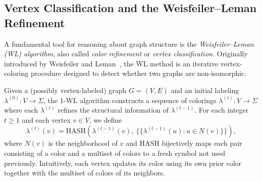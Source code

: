 




\subsection{Vertex Classification and the Weisfeiler--Leman Refinement}

A fundamental tool for reasoning about graph structure is the \emph{Weisfeiler--Leman (WL) algorithm}, also called \emph{color refinement} or \emph{vertex classification}. Originally introduced by Weisfeiler and Leman~\cite{Weisfeiler:1968ve}, the WL method is an iterative vertex-coloring procedure designed to detect whether two graphs are non-isomorphic.

Given a (possibly vertex-labeled) graph $G = (V,E)$ and an initial labeling $\lambda^{(0)} : V \to \Sigma$, the 1-WL algorithm constructs a sequence of colorings $\lambda^{(t)} : V \to \Sigma$ where each $\lambda^{(t)}$ refines the structural information of $\lambda^{(t-1)}$. For each integer $t \ge 1$ and each vertex $v \in V$, we define
\[
\lambda^{(t)}(v)
    = \mathrm{HASH}\!\left(
        \lambda^{(t-1)}(v),~
        \big\{\!\!\{\lambda^{(t-1)}(u) : u \in N(v)\}\!\!\}
    \right),
\]
where $N(v)$ is the neighborhood of $v$ and $\mathrm{HASH}$ bijectively maps each pair consisting of a color and a multiset of colors to a fresh symbol not used previously. Intuitively, each vertex updates its color using its own prior color together with the multiset of colors of its neighbors.

